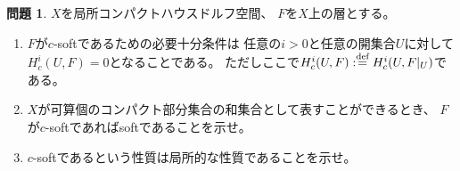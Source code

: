 \documentclass[uplatex,dvipdfmx]{jsarticle}
\theoremstyle{definition}
\newtheorem{prob}[prob]{問題}
\def\dfn{:\overset{\mbox{{\scriptsize def}}}{=}}
\begin{document}
\begin{prob}\label{2.6}
  \(X\)を局所コンパクトハウスドルフ空間、
  \(F\)を\(X\)上の層とする。
  \begin{enumerate}
    \item \label{2.6.1}
    \(F\)が\(c\)-softであるための必要十分条件は
    任意の\(i>0\)と任意の開集合\(U\)に対して
    \(H^i_c(U,F) = 0\)となることである。
    ただしここで\(H^i_c(U,F)\dfn H^i_c(U,F|_U)\)である。
    \item \label{2.6.2}
    \(X\)が可算個のコンパクト部分集合の和集合として表すことができるとき、
    \(F\)が\(c\)-softであればsoftであることを示せ。
    \item \label{2.6.3}
    \(c\)-softであるという性質は局所的な性質であることを示せ。
  \end{enumerate}
\end{prob}
\end{document}
